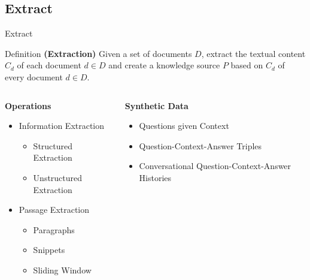\documentclass{beamer}
\begin{document}
\subsection*{Extract}
\begin{frame}{Extract}

  \begin{block}{Definition}
    \textbf{(Extraction)} Given a set of documents $D$, extract the textual content $C_d$ of each document $d \in D$ and create a knowledge source $P$ based on $C_d$ of every document $d \in D$. 
  \end{block}

  \begin{columns}[T] %
    \begin{column}{.5\textwidth}
      \textbf{Operations}
      \begin{itemize}
        \item Information Extraction
        \begin{itemize}
          \item Structured Extraction
          \item Unstructured Extraction
        \end{itemize}
        \item Passage Extraction 
        \begin{itemize}
          \item Paragraphs
          \item Snippets
          \item Sliding Window
        \end{itemize}
      \end{itemize}
    \end{column}
    
    \begin{column}{.5\textwidth}
      \textbf{Synthetic Data}
      \begin{itemize}
        \item Questions given Context
        \item Question-Context-Answer Triples
        \item Conversational Question-Context-Answer Histories
      \end{itemize}
    \end{column}
  \end{columns}
\end{frame}
\end{document}
